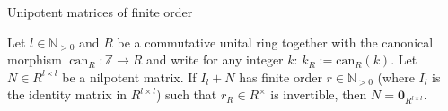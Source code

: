 \begin{appendixitem}{Unipotent matrices of finite order}
    \begin{lemma}
        Let \( l \in \mathbb{N}_{>0} \) and \( R \) be a commutative unital ring together with the canonical morphism \( \operatorname{can}_{R} \colon \mathbb{Z} \rightarrow R \) and write for any integer \( k \): \( k_R := \mathrm{can}_R\left(k\right) \). Let \( N \in R^{l\times l} \) be a nilpotent matrix. If \( I_{l} + N \) has finite order \( r \in \mathbb{N}_{>0} \) (where \( I_l \) is the identity matrix in \( R^{l\times l} \)) such that \( r_{R} \in R^{\times} \) is invertible, then \( N = \mathbf{0}_{R^{l\times l}} \).
    \end{lemma}


\end{appendixitem}

